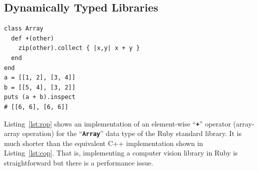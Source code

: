 \documentclass[12pt,a4paper,oneside,openright]{book}
\newcommand{\Ie}{That is, }
\newcommand{\lst}[1]{Listing~\ref{lst:#1}}
\newcommand{\code}[1]{``\texttt{\textbf{\textcolor{codegray}{\small{#1}}}}''}
\newcommand{\rubyout}{Comment lines (preceded with ``\#'') show the output of the program}
\begin{document}
\begin{CJK}{UTF8}{}
\subsection{Dynamically Typed Libraries}\label{cha:dynlib}
\lstset{language=Ruby,frame=single,numbers=none}
\begin{lstlisting}[float=htbp,caption={Multi-dimensional ``+'' operator implemented in Ruby. \rubyout},label=lst:rop]
class Array
  def +(other)
    zip(other).collect { |x,y| x + y }
  end
end
a = [[1, 2], [3, 4]]
b = [[5, 4], [3, 2]]
puts (a + b).inspect
# [[6, 6], [6, 6]]
\end{lstlisting}
\lst{rop} shows an implementation of an element-wise \code{+} operator (array-array operation) for the \code{Array} data type of the Ruby standard library. It is much shorter than the equivalent C++ implementation shown in \lst{cop}. \Ie implementing a computer vision library in Ruby is straightforward but there is a performance issue.


\end{CJK}
\end{document}
